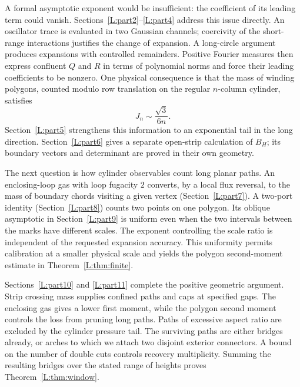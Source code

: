 \documentclass[11pt]{article}
\numberwithin{equation}{section}
\theoremstyle{definition}\newtheorem{definition}[theorem]{Definition}
\theoremstyle{remark}\newtheorem{remark}[theorem]{Remark}
\begin{document}
A formal asymptotic exponent would be insufficient: the coefficient of
its leading term could vanish. Sections~\ref{L:part2}--\ref{L:part4}
address this issue directly. An oscillator trace is evaluated in two
Gaussian channels; coercivity of the short-range interactions justifies
the change of expansion. A long-circle argument produces expansions with
controlled remainders. Positive Fourier measures then express confluent
$Q$ and $R$ in terms of polynomial norms and force their leading
coefficients to be nonzero. One physical consequence is that the mass of
winding polygons, counted modulo row translation on the regular
$n$-column cylinder, satisfies
\[
 J_n\sim\frac{\sqrt3}{6n}.
\]
Section~\ref{L:part5} strengthens this information to an exponential tail
in the long direction. Section~\ref{L:part6} gives a separate open-strip
calculation of $B_H$; its boundary vectors and determinant are proved in
their own geometry.

The next question is how cylinder observables count long planar paths.
An enclosing-loop gas with loop fugacity $2$ converts, by a local flux
reversal, to the mass of boundary chords visiting a given vertex
(Section~\ref{L:part7}). A two-port identity
(Section~\ref{L:part8}) counts two points on one polygon. Its oblique
asymptotic in Section~\ref{L:part9} is uniform even when the two intervals
between the marks have different scales. The exponent controlling the
scale ratio is independent of the requested expansion accuracy. This
uniformity permits calibration at a smaller physical scale and yields
the polygon second-moment estimate in Theorem~\ref{L:thm:finite}.

Sections~\ref{L:part10} and \ref{L:part11} complete the positive geometric
argument. Strip crossing mass supplies confined paths and caps at
specified gaps. The enclosing gas gives a lower first moment, while the
polygon second moment controls the loss from pruning long paths. Paths
of excessive aspect ratio are excluded by the cylinder pressure tail.
The surviving paths are either bridges already, or arches to which we
attach two disjoint exterior connectors. A bound on the number of double
cuts controls recovery multiplicity. Summing the resulting bridges over
the stated range of heights proves Theorem~\ref{L:thm:window}.
\end{document}
